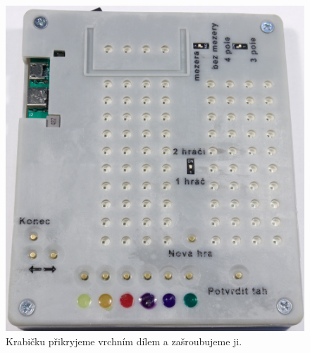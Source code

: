   \begin{figure}[!h]
    \begin{center}
      \includegraphics[scale=0.5]{prilohy/Krabicka_cela.jpg}
    \end{center}
    \caption[Krabičku přikryjeme vrchním dílem a zašroubujeme ji]{Krabičku přikryjeme vrchním dílem a zašroubujeme ji.}
  \end{figure}

